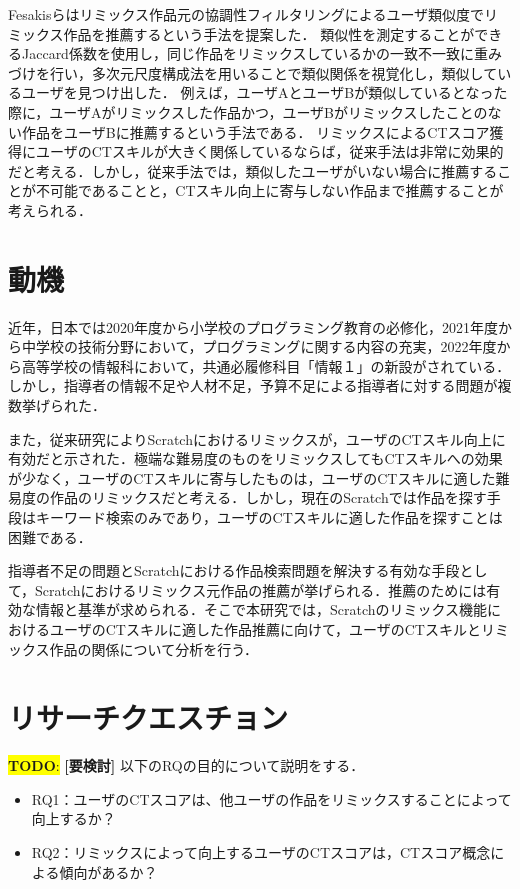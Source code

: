 \documentclass[11pt]{jreport}
\newcommand{\todo}[1]{\colorbox{yellow}{{\bf TODO}:}{\color{red} {\textbf{[#1]}}}}  %
\begin{document}
Fesakisらはリミックス作品元の協調性フィルタリングによるユーザ類似度でリミックス作品を推薦するという手法を提案した．\cite{fesakis2009proposing}
類似性を測定することができるJaccard係数を使用し，同じ作品をリミックスしているかの一致不一致に重みづけを行い，多次元尺度構成法を用いることで類似関係を視覚化し，類似しているユーザを見つけ出した．
例えば，ユーザAとユーザBが類似しているとなった際に，ユーザAがリミックスした作品かつ，ユーザBがリミックスしたことのない作品をユーザBに推薦するという手法である．
リミックスによるCTスコア獲得にユーザのCTスキルが大きく関係しているならば，従来手法は非常に効果的だと考える．しかし，従来手法では，類似したユーザがいない場合に推薦することが不可能であることと，CTスキル向上に寄与しない作品まで推薦することが考えられる．


\section{動機}
近年，日本では2020年度から小学校のプログラミング教育の必修化，2021年度から中学校の技術分野において，プログラミングに関する内容の充実，2022年度から高等学校の情報科において，共通必履修科目「情報１」の新設がされている．\cite{monkashou}しかし，指導者の情報不足や人材不足，予算不足による指導者に対する問題が複数挙げられた．\cite{monkashou2}

また，従来研究によりScratchにおけるリミックスが，ユーザのCTスキル向上に有効だと示された．極端な難易度のものをリミックスしてもCTスキルへの効果が少なく，ユーザのCTスキルに寄与したものは，ユーザのCTスキルに適した難易度の作品のリミックスだと考える．しかし，現在のScratchでは作品を探す手段はキーワード検索のみであり，ユーザのCTスキルに適した作品を探すことは困難である．

指導者不足の問題とScratchにおける作品検索問題を解決する有効な手段として，Scratchにおけるリミックス元作品の推薦が挙げられる．推薦のためには有効な情報と基準が求められる．そこで本研究では，Scratchのリミックス機能におけるユーザのCTスキルに適した作品推薦に向けて，ユーザのCTスキルとリミックス作品の関係について分析を行う．

\section{リサーチクエスチョン}
\todo{要検討}
以下のRQの目的について説明をする．
\begin{itemize}
  \item RQ1：ユーザのCTスコアは、他ユーザの作品をリミックスすることによって向上するか？
  \item RQ2：リミックスによって向上するユーザのCTスコアは，CTスコア概念による傾向があるか？
\end{itemize}
\end{document}
